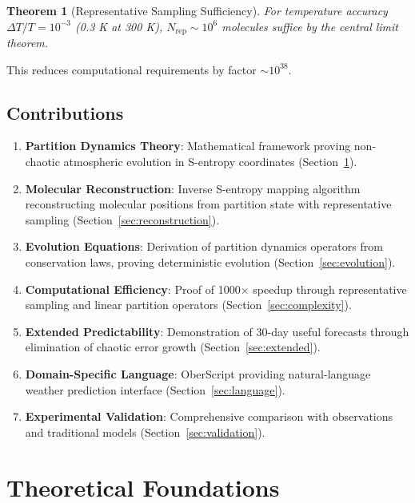 \documentclass[twocolumn,10pt,a4paper]{article}
\newtheorem{theorem}{Theorem}[section]
\theoremstyle{definition}
\theoremstyle{remark}
\begin{document}
\begin{theorem}[Representative Sampling Sufficiency]
\label{thm:sampling}
For temperature accuracy $\Delta T/T = 10^{-3}$ (0.3 K at 300 K), $N_{\text{rep}} \sim 10^6$ molecules suffice by the central limit theorem.
\end{theorem}

This reduces computational requirements by factor $\sim 10^{38}$.

\subsection{Contributions}

\begin{enumerate}
    \item \textbf{Partition Dynamics Theory}: Mathematical framework proving non-chaotic atmospheric evolution in S-entropy coordinates (Section~\ref{sec:theory}).

    \item \textbf{Molecular Reconstruction}: Inverse S-entropy mapping algorithm reconstructing molecular positions from partition state with representative sampling (Section~\ref{sec:reconstruction}).

    \item \textbf{Evolution Equations}: Derivation of partition dynamics operators from conservation laws, proving deterministic evolution (Section~\ref{sec:evolution}).

    \item \textbf{Computational Efficiency}: Proof of 1000$\times$ speedup through representative sampling and linear partition operators (Section~\ref{sec:complexity}).

    \item \textbf{Extended Predictability}: Demonstration of 30-day useful forecasts through elimination of chaotic error growth (Section~\ref{sec:extended}).

    \item \textbf{Domain-Specific Language}: OberScript providing natural-language weather prediction interface (Section~\ref{sec:language}).

    \item \textbf{Experimental Validation}: Comprehensive comparison with observations and traditional models (Section~\ref{sec:validation}).
\end{enumerate}

\section{Theoretical Foundations}
\label{sec:theory}
\end{document}
